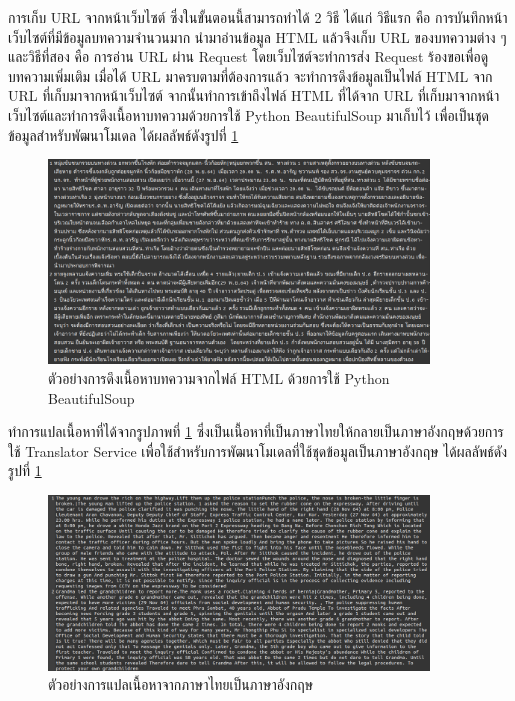\documentclass[12pt,oneside,openright,a4paper]{cpe-thai-project}
\begin{document}
    \hspace{1cm}การเก็บ URL จากหน้าเว็บไซต์ ซึ่งในขั้นตอนนี้สามารถทำได้ 2 วิธี ได้แก่ วิธีแรก คือ การบันทึกหน้าเว็บไซต์ที่มีข้อมูลบทความจำนวนมาก นำมาอ่านข้อมูล HTML 
    แล้วจึงเก็บ URL ของบทความต่าง ๆ และวิธีที่สอง คือ การอ่าน URL ผ่าน Request โดยเว็บไซต์จะทำการส่ง Request ร้องขอเพื่อดูบทความเพิ่มเติม 
    เมื่อได้ URL มาครบตามที่ต้องการแล้ว จะทำการดึงข้อมูลเป็นไฟล์ HTML จาก URL ที่เก็บมาจากหน้าเว็บไซต์ 
    จากนั้นทำการเข้าถึงไฟล์ HTML ที่ได้จาก URL ที่เก็บมาจากหน้าเว็บไซต์และทำการดึงเนื้อหาบทความด้วยการใช้ Python BeautifulSoup มาเก็บไว้ 
    เพื่อเป็นชุดข้อมูลสำหรับพัฒนาโมเดล ได้ผลลัพธ์ดังรูปที่ \ref{fig:data_thai}
    \begin{figure}[!ht]\centering
      \includegraphics[width=0.9\textwidth]{./img/data_col_thai.png}
      \caption{ตัวอย่างการดึงเนื้อหาบทความจากไฟล์ HTML ด้วยการใช้ Python BeautifulSoup}\label{fig:data_thai}
    \end{figure}

    \hspace{1cm}ทำการแปลเนื้อหาที่ได้จากรูปภาพที่ \ref{fig:data_thai} ซึ่งเป็นเนื้อหาที่เป็นภาษาไทยให้กลายเป็นภาษาอังกฤษด้วยการใช้ Translator Service
    เพื่อใช้สำหรับการพัฒนาโมเดลที่ใช้ชุดข้อมูลเป็นภาษาอังกฤษ ได้ผลลัพธ์ดังรูปที่ \ref{fig:data_thai}
    \begin{figure}[!ht]\centering
      \includegraphics[width=0.9\textwidth]{./img/data_col_eng.png}
      \caption{ตัวอย่างการแปลเนื้อหาจากภาษาไทยเป็นภาษาอังกฤษ}\label{fig:data_eng}
    \end{figure}
    \newpage
\end{document}
